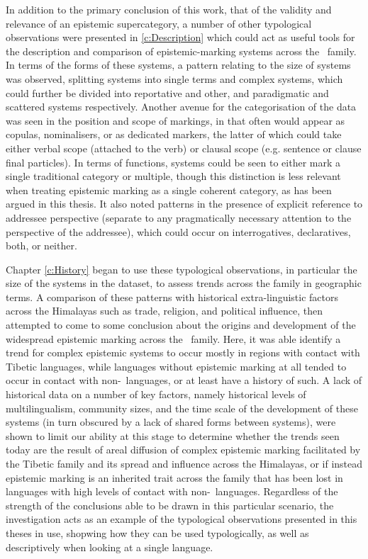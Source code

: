 In addition to the primary conclusion of this work, that of the validity and relevance of an epistemic supercategory, a number of other typological observations were presented in \ref{c:Description} which could act as useful tools for the description and comparison of epistemic-marking systems across the \lfam\ family. In terms of the forms of these systems, a pattern relating to the size of systems was observed, splitting systems into single terms and complex systems, which could further be divided into reportative and other, and paradigmatic and scattered systems respectively. Another avenue for the categorisation of the data was seen in the position and scope of markings, in that often would appear as copulas, nominalisers, or as dedicated markers, the latter of which could take either verbal scope (attached to the verb) or clausal scope (e.g. sentence or clause final particles). In terms of functions, systems could be seen to either mark a single traditional category or multiple, though this distinction is less relevant when treating epistemic marking as a single coherent category, as has been argued in this thesis. It also noted patterns in the presence of explicit reference to addressee perspective (separate to any pragmatically necessary attention to the perspective of the addressee), which could occur on interrogatives, declaratives, both, or neither. 

Chapter \ref{c:History} began to use these typological observations, in particular the size of the systems in the dataset, to assess trends across the family in geographic terms. A comparison of these patterns with historical extra-linguistic factors across the Himalayas such as trade, religion, and political influence, then attempted to come to some conclusion about the origins and development of the widespread epistemic marking across the \lfam\ family. Here, it was able identify a trend for complex epistemic systems to occur mostly in regions with contact with Tibetic languages, while languages without epistemic marking at all tended to occur in contact with non-\lfam\ languages, or at least have a history of such. A lack of historical data on a number of key factors, namely historical levels of multilingualism, community sizes, and the time scale of the development of these systems (in turn obscured by a lack of shared forms between systems), were shown to limit our ability at this stage to determine whether the trends seen today are the result of areal diffusion of complex epistemic marking facilitated by the Tibetic family and its spread and influence across the Himalayas, or if instead epistemic marking is an inherited trait across the family that has been lost in languages with high levels of contact with non-\lfam\ languages. Regardless of the strength of the conclusions able to be drawn in this particular scenario, the investigation acts as an example of the typological observations presented in this theses in use, shopwing how they can be used typologically, as well as descriptively when looking at a single language.

